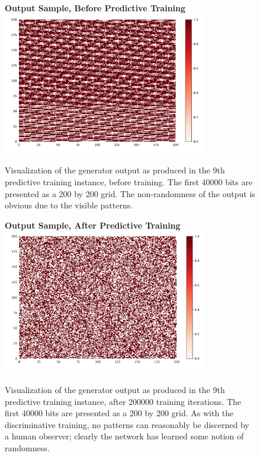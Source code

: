 \documentclass[12pt, titlepage]{report}
\theoremstyle{definition}
\begin{document}
    \begin{figure}[H]
    \centering
    \textbf{Output Sample, Before Predictive Training}
    \includegraphics[width=0.8\textwidth]{img/predictive_before}\\
    \caption[Visualization of output randomness before training, P9]{Visualization of the generator output as produced in the 9th predictive training instance, before training. The first 40000 bits are presented as a 200 by 200 grid. The non-randomness of the output is obvious due to the visible patterns.}
    \label{figure:visualize_predictive_before}
    \end{figure}
    
    \begin{figure}[H]
    \centering
    \textbf{Output Sample, After Predictive Training}
    \includegraphics[width=0.8\textwidth]{img/predictive_after}\\
    \caption[Visualization of output randomness after training, P9]{Visualization of the generator output as produced in the 9th predictive training instance, after 200000 training iterations. The first 40000 bits are presented as a 200 by 200 grid. As with the discriminative training, no patterns can reasonably be discerned by a human observer; clearly the network has learned some notion of randomness.}
    \label{figure:visualize_predictive_after}
    \end{figure}
\end{document}
